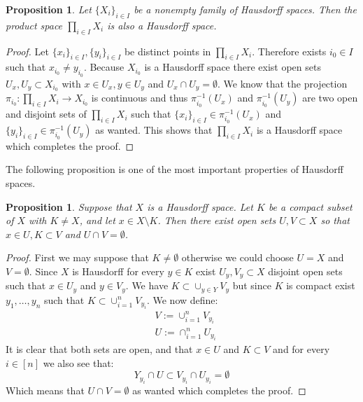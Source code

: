 \documentclass[11pt,a4paper]{article}
\theoremstyle{definition}
\theoremstyle{plain}
\newtheorem{proposition}[theorem]{Proposition}
\begin{document}
  \begin{proposition}
    Let $\{X_i\}_{i \in I}$ be a nonempty family of Hausdorff spaces. 
    Then the product space $\prod_{i \in I}{X_i}$ is also a Hausdorff 
    space.
  \end{proposition}
  \begin{proof}
    Let $\{x_i\}_{i \in I}, \{y_i\}_{i \in I}$ be distinct points
    in $\prod_{i \in I}{X_i}$. Therefore exists $i_0 \in I$ such that
    $x_{i_0} \neq y_{i_0}$. Because $X_{i_0}$ is a Hausdorff space 
    there exist open sets $U_x, U_y \subset X_{i_0}$ with 
    $x \in U_x, y \in U_y$ and $U_x \cap U_y = \emptyset$. We know that
    the projection $\pi_{i_0} \colon \prod_{i \in I}{X_i} \to X_{i_0}$
    is continuous and thus $\pi_{i_0}^{-1}(U_x)$ and $\pi_{i_0}^{-1}(U_y)$
    are two open and disjoint sets of $\prod_{i \in I}{X_i}$ such
    that $\{x_i\}_{i \in I} \in \pi_{i_0}^{-1}(U_x)$ and 
    $\{y_i\}_{i \in I} \in \pi_{i_0}^{-1}(U_y)$ as wanted. This shows
    that $\prod_{i \in I}{X_i}$ is a Hausdorff space which completes
    the proof.
  \end{proof}
  
  The following proposition is one of the most important properties of
  Hausdorff spaces.
  
  \begin{proposition}
    Suppose that $X$ is a Hausdorff space. Let $K$ be a compact subset
    of $X$ with $K \neq X$, and let $x \in X \setminus K$. Then there 	
    exist open sets $U, V \subset X$ so that $x \in U , K \subset V$ 
    and $U \cap V = \emptyset$.
  \end{proposition}
  \begin{proof}
    First we may suppose that $K \neq \emptyset$ otherwise we could
    choose $U = X$ and $V = \emptyset$. Since $X$ is Hausdorff for
    every $y \in K$ exist $U_y, V_y \subset X$ disjoint open sets 
    such that $x \in U_y$ and $y \in V_y$. We have 
    $K \subset \cup_{y \in Y}{V_y}$ but since $K$ is compact exist
    $y_1,\dots,y_n$ such that $K \subset \cup_{i=1}^{n}{V_{y_i}}$.
    We now define:
    \begin{align*}
      &V := \cup_{i=1}^{n}{V_{y_i}} \\
      &U := \cap_{i=1}^{n}{U_{y_i}}
    \end{align*}
    It is clear that both sets are open, and that $x \in U$ and
    $K \subset V$ and for every $i \in [n]$ we also see that:
    \[
      Y_{y_i} \cap U \subset V_{y_i} \cap U_{y_i} = \emptyset
    \]
    Which means that $U \cap V = \emptyset$ as wanted which completes
    the proof.
  \end{proof}
  
\end{document}
